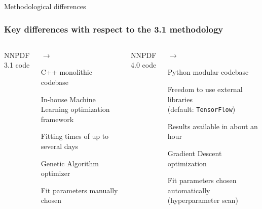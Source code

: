 \documentclass[aspectratio=169,10pt]{beamer}
\newcommand{\mycolutitle}[1]{\vspace{-0.7cm}\begin{center}#1\end{center}\vspace{-0.1cm}}
\begin{document}
\begin{frame}[t]{Methodological differences}
    \frametitle{Key differences with respect to the 3.1 methodology}
    \footnotesize
    \begin{columns}[t]
            \mycolutitle{NNPDF 3.1 code}
            \begin{list}{\color{darkred} $\rightarrow$}{}
                \item C++ monolithic codebase
                 \item In-house Machine Learning optimization framework
                \item Fitting times of up to several days
                \item  Genetic Algorithm optimizer
                \item Fit parameters manually chosen
            \end{list}
            \mycolutitle{NNPDF 4.0 code}
            \begin{list}{\color{darkgreen} $\rightarrow$}{} 
                \item Python modular codebase 
                \item Freedom to use external libraries \\ (default: \texttt{TensorFlow})
                \item Results available in about an hour
                \item Gradient Descent optimization
                \item Fit parameters chosen automatically (hyperparameter scan)
            \end{list}
    \end{columns}
\end{frame}
\end{document}
